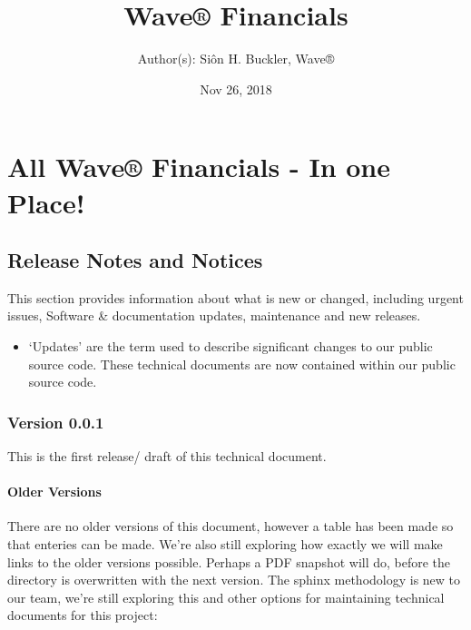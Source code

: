 \documentclass[letterpaper,10pt,english]{sphinxmanual}
\title{Wave® Financials}
\date{Nov 26, 2018}
\author{Author(s): Siôn H. Buckler, Wave®}
\begin{document}
\pagestyle{empty}
\maketitle
\pagestyle{plain}
\sphinxtableofcontents
\pagestyle{normal}
\label{\detokenize{index::doc}}



\chapter{All Wave® Financials - In one Place!}
\label{\detokenize{index:all-wave-financials-in-one-place}}

\section{Release Notes and Notices}
\label{\detokenize{releasenotes:release-notes-and-notices}}\label{\detokenize{releasenotes::doc}}
This section provides information about what is new or changed, including urgent issues, Software \& documentation updates, maintenance and new releases.
\begin{itemize}
\item {} 
‘Updates’ are the term used to describe significant changes to our public source code. These technical documents are now contained within our public source code.

\end{itemize}


\subsection{Version 0.0.1}
\label{\detokenize{releasenotes:version-0-0-1}}
This is the first release/ draft of this technical document.


\subsubsection{Older Versions}
\label{\detokenize{releasenotes:older-versions}}
There are no older versions of this document, however a table has been made so that enteries can be made. We’re also still exploring how exactly we will make links to the older versions possible. Perhaps a PDF snapshot will do, before the directory is overwritten with the next version. The sphinx methodology is new to our team, we’re still exploring this and other options for maintaining technical documents for this project:
\end{document}
